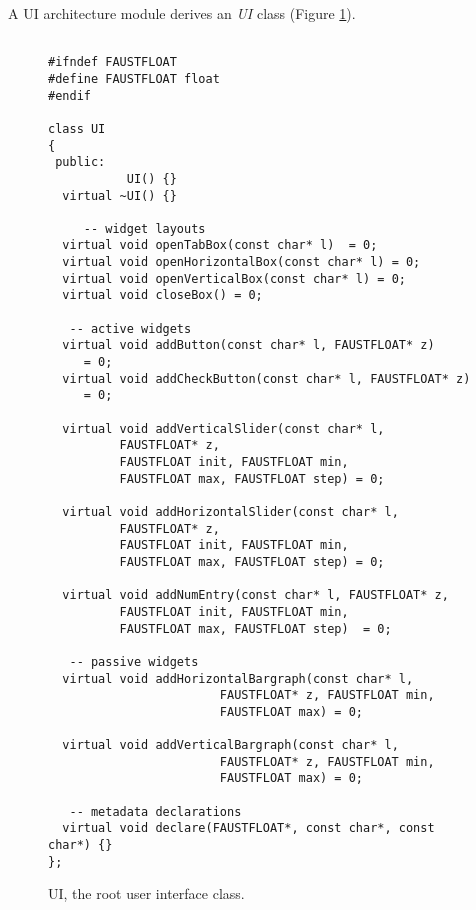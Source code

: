 A \faust UI architecture module derives an \emph{UI} class (Figure \ref{tab:ui}). 

\begin{figure}[htp]
\begin{center}
\begin{lstlisting}[basicstyle=\ttfamily\footnotesize\color{yotxt}]

#ifndef FAUSTFLOAT
#define FAUSTFLOAT float
#endif

class UI
{
 public:
           UI() {}
  virtual ~UI() {}
  
     -- widget layouts
  virtual void openTabBox(const char* l)  = 0;
  virtual void openHorizontalBox(const char* l) = 0;
  virtual void openVerticalBox(const char* l) = 0;
  virtual void closeBox() = 0;

   -- active widgets
  virtual void addButton(const char* l, FAUSTFLOAT* z)      
  	 = 0;
  virtual void addCheckButton(const char* l, FAUSTFLOAT* z) 
  	 = 0;
  
  virtual void addVerticalSlider(const char* l,
          FAUSTFLOAT* z, 
          FAUSTFLOAT init, FAUSTFLOAT min, 
          FAUSTFLOAT max, FAUSTFLOAT step) = 0;
          
  virtual void addHorizontalSlider(const char* l, 
          FAUSTFLOAT* z, 
          FAUSTFLOAT init, FAUSTFLOAT min,
          FAUSTFLOAT max, FAUSTFLOAT step) = 0;
          
  virtual void addNumEntry(const char* l, FAUSTFLOAT* z, 
          FAUSTFLOAT init, FAUSTFLOAT min,
          FAUSTFLOAT max, FAUSTFLOAT step)  = 0;
      
   -- passive widgets
  virtual void addHorizontalBargraph(const char* l,
                        FAUSTFLOAT* z, FAUSTFLOAT min, 
                        FAUSTFLOAT max) = 0;
                        
  virtual void addVerticalBargraph(const char* l, 
                        FAUSTFLOAT* z, FAUSTFLOAT min, 
                        FAUSTFLOAT max) = 0; 
                        
   -- metadata declarations
  virtual void declare(FAUSTFLOAT*, const char*, const char*) {}
};
\end{lstlisting} 
\end{center}
\caption{UI, the root user interface class.}
\label{tab:ui}
\end{figure}

